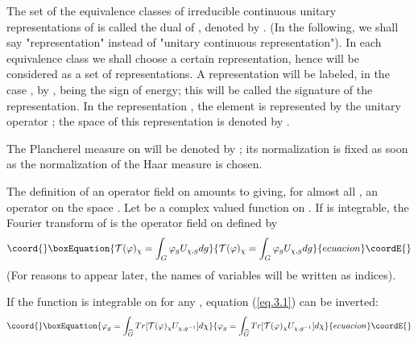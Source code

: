 \documentclass[a4paper,11pt]{article}
\def\Uc#1{U_{\chi,{#1}}}
\begin{document}
The set of the equivalence classes of irreducible continuous unitary representations of \coordHE{} is 
called the dual of \coordHE{}, denoted by \myHighlight{$\Gc$}\coordHE{}. (In the following, we shall say "representation" 
instead of "unitary continuous representation"). In each equivalence class we shall choose a 
certain representation, hence \myHighlight{$\Gc$}\coordHE{} will be considered as a set of representations. A 
representation will be labeled, in the case \coordHE{}, by \coordHE{}, \myHighlight{$\epsilon$}\coordHE{} 
being the sign of energy; this \myHighlight{$\chi$}\coordHE{} will be called the signature of the representation. In 
the representation \myHighlight{$\chi \in  \Gc$}\coordHE{}, the element \coordHE{} is represented by the unitary 
operator \myHighlight{$\Ucg$}\coordHE{} ; the space of this representation is denoted by \coordHE{}. 


The Plancherel measure on \myHighlight{$\Gc$}\coordHE{} will be denoted by \coordHE{}; its normalization is fixed as soon 
as the normalization of the Haar measure is chosen. 

The definition of an operator field on \myHighlight{$\Gc$}\coordHE{} amounts to giving, for almost all \myHighlight{$\chi \in  \Gc$}\coordHE{}, 
an operator \coordHE{} on the space \coordHE{}. Let \myHighlight{$\varphi$}\coordHE{} be a complex valued 
function on \coordHE{}. If \myHighlight{$\varphi$}\coordHE{} is integrable, the Fourier 
transform of \myHighlight{$\varphi$}\coordHE{}  is the operator field on \myHighlight{$\Gc$}\coordHE{} defined by
\begin{equation}\coord{}\boxEquation{
 \label{eq.3.1}
   \mathcal{T}(\varphi)_{\chi} = \int_G \varphi_g \Ucg dg
}{
 \mathcal{T}(\varphi)_{\chi} = \int_G \varphi_g \Ucg dg
}{ecuacion}\coordE{}\end{equation}
(For reasons to appear later, the names of variables will be written as indices). 

If the function \coordHE{} is integrable on \myHighlight{$\Gc$}\coordHE{} 
for any \coordHE{}, equation (\ref{eq.3.1}) can be inverted:
\begin{equation}\coord{}\boxEquation{
 \label{eq.3.2}
 \varphi_g = \int_{\Gc} Tr[\mathcal{T}(\varphi)_{\chi} \Uc{g^{-1}}] d\chi
}{
 \varphi_g = \int_{\Gc} Tr[\mathcal{T}(\varphi)_{\chi} \Uc{g^{-1}}] d\chi
}{ecuacion}\coordE{}\end{equation}
\end{document}
